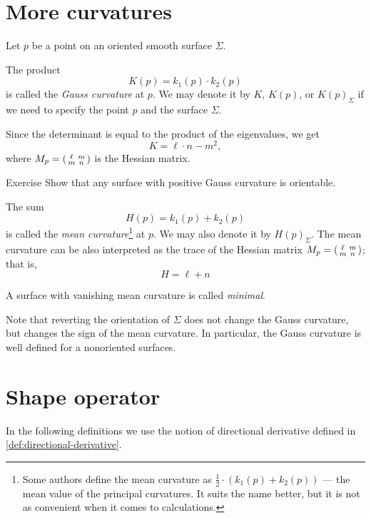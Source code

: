 \section{More curvatures}\label{sec:More curvatures}

Let $p$ be a point on an oriented smooth surface $\Sigma$.

The product 
\[K(p)=k_1(p)\cdot k_2(p)\]
is called the \emph{Gauss curvature} at $p$.
We may denote it by $K$, $K(p)$, or $K(p)_\Sigma$ if we need to specify the point $p$ and the surface $\Sigma$.

Since the determinant is equal to the product of the eigenvalues, we get
\[K=\ell\cdot n-m^2,\]
where 
$M_p\z=
(\begin{smallmatrix}
\ell&m
\\
m&n
\end{smallmatrix}
)
$ is the Hessian matrix.

\begin{thm}{Exercise}\label{ex:gauss+orientable}
Show that any surface with positive Gauss curvature is orientable. 
\end{thm}

The sum 
\[H(p)=k_1(p)+ k_2(p)\] 
is called the \emph{mean curvature}\footnote{Some authors define the mean curvature as $\tfrac12\cdot(k_1(p)+ k_2(p))$ --- the mean value of the principal curvatures. It suits the name better, but it is not as convenient when it comes to calculations.} at $p$.
We may also denote it by $H(p)_\Sigma$.
The mean curvature can be also interpreted as the trace of the Hessian matrix $M_p\z=
(\begin{smallmatrix}
\ell&m
\\
m&n
\end{smallmatrix}
)$;
that is,
\[H=\ell+n\] 

A surface with vanishing mean curvature is called \emph{minimal}.

Note that reverting the orientation of $\Sigma$ does not change the Gauss curvature, but changes the sign of the mean curvature.
In particular, the Gauss curvature is well defined  for a nonoriented surfaces.

\section{Shape operator}

In the following definitions we use the notion of directional derivative defined in \ref{def:directional-derivative}.

